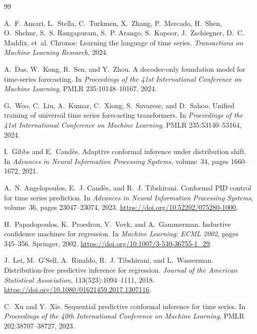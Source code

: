 \documentclass[10pt]{article}
\begin{document}
\begin{thebibliography}{99}
\small

A.~F. Ansari, L.~Stella, C.~Turkmen, X.~Zhang, P.~Mercado, H.~Shen, O.~Shchur,
S.~S. Rangapuram, S.~P. Arango, S.~Kapoor, J.~Zschiegner, D.~C. Maddix, et~al.
\newblock Chronos: Learning the language of time series.
\newblock \emph{Transactions on Machine Learning Research}, 2024.

A.~Das, W.~Kong, R.~Sen, and Y.~Zhou.
\newblock A decoder-only foundation model for time-series forecasting.
\newblock In \emph{Proceedings of the 41st International Conference on Machine Learning}, PMLR 235:10148--10167, 2024.

G.~Woo, C.~Liu, A.~Kumar, C.~Xiong, S.~Savarese, and D.~Sahoo.
\newblock Unified training of universal time series forecasting transformers.
\newblock In \emph{Proceedings of the 41st International Conference on Machine Learning}, PMLR 235:53140--53164, 2024.

I.~Gibbs and E.~Cand\`es.
\newblock Adaptive conformal inference under distribution shift.
\newblock In \emph{Advances in Neural Information Processing Systems}, volume~34, pages 1660--1672, 2021.

A.~N. Angelopoulos, E.~J. Cand\`es, and R.~J. Tibshirani.
\newblock Conformal PID control for time series prediction.
\newblock In \emph{Advances in Neural Information Processing Systems}, volume~36, pages 23047--23074, 2023. \url{https://doi.org/10.52202/075280-1000}.

H.~Papadopoulos, K.~Proedrou, V.~Vovk, and A.~Gammerman.
\newblock Inductive confidence machines for regression.
\newblock In \emph{Machine Learning: ECML 2002}, pages 345--356. Springer, 2002. \url{https://doi.org/10.1007/3-540-36755-1_29}.

J.~Lei, M.~G'Sell, A.~Rinaldo, R.~J. Tibshirani, and L.~Wasserman.
\newblock Distribution-free predictive inference for regression.
\newblock \emph{Journal of the American Statistical Association}, 113(523):1094--1111, 2018. \url{https://doi.org/10.1080/01621459.2017.1307116}.

C.~Xu and Y.~Xie.
\newblock Sequential predictive conformal inference for time series.
\newblock In \emph{Proceedings of the 40th International Conference on Machine Learning}, PMLR 202:38707--38727, 2023.


\end{thebibliography}
\end{document}
